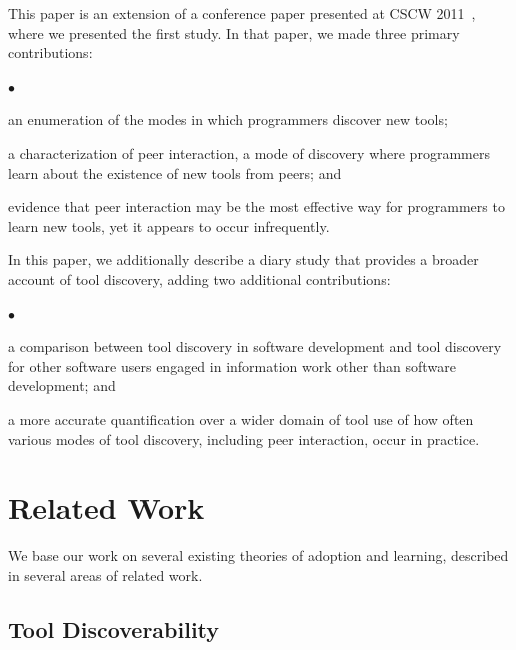 \documentclass[smallextended]{svjour3}
\newcommand{\squishlist}{
	\vspace{0mm}
   \begin{list}{$\bullet$}
    { \setlength{\itemsep}{0pt}      \setlength{\parsep}{3pt}
      \setlength{\topsep}{3pt}       \setlength{\partopsep}{0pt}
      \setlength{\leftmargin}{1.5em} \setlength{\labelwidth}{1em}
      \setlength{\labelsep}{0.5em} } }
\newcommand{\squishend}{
    \end{list}  }
\newcommand\discovery{peer interaction\xspace}
\newcommand\context{mode\xspace}
\newcommand\contexts{modes\xspace}
\begin{document}
This paper is an extension of a conference paper presented at CSCW 2011~\cite{murphy-hill11:peer},
where we presented the first study.
In that paper, we made three primary contributions:

\squishlist
  \item an enumeration of the \contexts in which programmers discover new tools;
  \item a characterization of \discovery, a \context of discovery where
  		programmers learn about the existence of new tools from peers; and
  \item evidence that \discovery may be the most effective way for
  		programmers to learn new tools, yet it appears to occur infrequently.
\squishend

\noindent
In this paper, we additionally describe a diary study that provides a broader account
of tool discovery, adding two additional contributions:

\squishlist
  \item a comparison between tool discovery in software development and tool
  		discovery for other software users engaged in information work other than software development; and
  \item a more accurate quantification over a wider domain of tool use 
  		of how often various \contexts of tool discovery,
  		including \discovery, occur in practice.
\squishend



\section{Related Work}\label{sec:relatedWork}

\noindent
We base our work on several existing theories of adoption and
learning, described in several areas of related work.

\subsection{Tool Discoverability}\label{sec:terminology}
\end{document}
